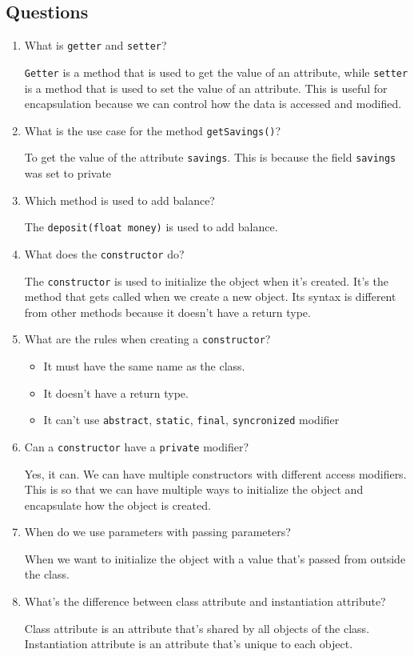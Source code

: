 \documentclass[12pt,titlepage]{article}
\begin{document}
\subsection{Questions}
\begin{enumerate}
    \item {
        What is \texttt{getter} and \texttt{setter}?

        \texttt{Getter} is a method that is used to get the value of an attribute, while \texttt{setter} is a method
        that is used to set the value of an attribute.
        This is useful for encapsulation because we can control how the data is accessed and modified.
    }
    \item {
        What is the use case for the method \texttt{getSavings()}?

        To get the value of the attribute \texttt{savings}. This is because
        the field \texttt{savings} was set to private 
    }
    \item {
        Which method is used to add balance?

        The \texttt{deposit(float money)} is used to add balance.
    }
    \item {
        What does the \texttt{constructor} do?

        The \texttt{constructor} is used to initialize the object when it's created.
        It's the method that gets called when we create a new object.
        Its syntax is different from other methods because it doesn't have a return type.
    }
    \item {
        What are the rules when creating a \texttt{constructor}?

        \begin{itemize}
            \item It must have the same name as the class.
            \item It doesn't have a return type.
            \item It can't use \texttt{abstract}, \texttt{static}, \texttt{final}, \texttt{syncronized} modifier
        \end{itemize}
    }
    \item {
        Can a \texttt{constructor} have a \texttt{private} modifier?

        Yes, it can. We can have multiple constructors with different access modifiers.
        This is so that we can have multiple ways to initialize the object and encapsulate
        how the object is created.
    }
    \item {
        When do we use parameters with passing parameters?

        When we want to initialize the object with a value that's passed from outside the class.
    }
    \item {
        What's the difference between class attribute and instantiation attribute?

        Class attribute is an attribute that's shared by all objects of the class.
        Instantiation attribute is an attribute that's unique to each object.
    }
\end{enumerate}
\end{document}
